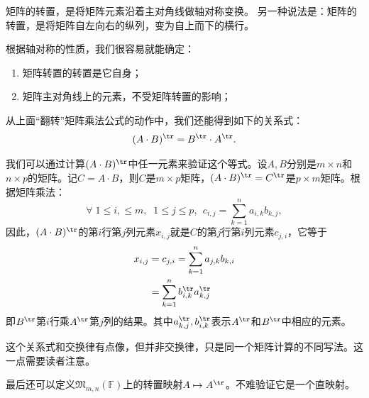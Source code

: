 \documentclass[12pt,UTF8,fontset=none]{ctexbook}
\begin{document}
矩阵的转置，是将矩阵元素沿着主对角线做轴对称变换。
另一种说法是：矩阵的转置，是将矩阵自左向右的纵列，变为自上而下的横行。

根据轴对称的性质，我们很容易就能确定：
\begin{enumerate}
    \item 矩阵转置的转置是它自身；
    \item 矩阵主对角线上的元素，不受矩阵转置的影响；
\end{enumerate}

从上面“翻转”矩阵乘法公式的动作中，我们还能得到如下的关系式：
$$ (A \cdot B)^{\tr} = B^{\tr} \cdot A^{\tr}.$$

我们可以通过计算$(A\cdot B)^{\tr}$中任一元素来验证这个等式。设$A,B$分别是$m\times n$和$n\times p$的矩阵。记$C = A\cdot B$，则$C$是$m \times p$矩阵，$(A\cdot B)^{\tr} = C^{\tr}$是$p\times m$矩阵。根据矩阵乘法：
$$ \forall \; 1\leq i, \leq m,\; \; 1 \leqslant j \leqslant p,\;\, c_{i, j} = \sum_{k=1}^n a_{i,k} b_{k,j},$$
因此，$(A\cdot B)^{\tr}$的第$i$行第$j$列元素$x_{i,j}$就是$C$的第$j$行第$i$列元素$c_{j,i}$，它等于
\begin{align*}
    x_{i,j} &= c_{j,i} = \sum_{k=1}^n a_{j,k} b_{k,i}  \\
    &= \sum_{k=1}^n b^{\tr}_{i, k} a^{\tr}_{k, j}  
\end{align*}
即$B^{\tr}$第$i$行乘$A^{\tr}$第$j$列的结果。其中$a^{\tr}_{k, j} , b^{\tr}_{i, k}$表示$A^{\tr}$和$B^{\tr}$中相应的元素。

这个关系式和交换律有点像，但并非交换律，只是同一个矩阵计算的不同写法。这一点需要读者注意。

最后还可以定义$\mathfrak{M}_{m,n}(\mathbb{F})$上的转置映射$A \mapsto A^{\tr}$。不难验证它是一个直映射。
\end{document}
